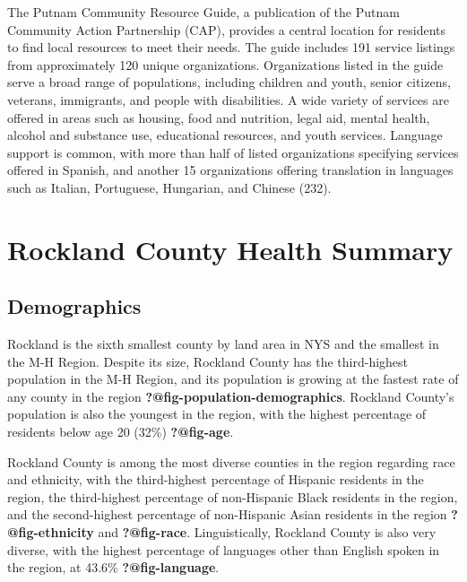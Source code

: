 \documentclass[
  english,
  letterpaper,
]{report}
\begin{document}
The Putnam Community Resource Guide, a publication of the Putnam
Community Action Partnership (CAP), provides a central location for
residents to find local resources to meet their needs. The guide
includes 191 service listings from approximately 120 unique
organizations. Organizations listed in the guide serve a broad range of
populations, including children and youth, senior citizens, veterans,
immigrants, and people with disabilities. A wide variety of services are
offered in areas such as housing, food and nutrition, legal aid, mental
health, alcohol and substance use, educational resources, and youth
services. Language support is common, with more than half of listed
organizations specifying services offered in Spanish, and another 15
organizations offering translation in languages such as Italian,
Portuguese, Hungarian, and Chinese (232).

\section{Rockland County Health
Summary}\label{rockland-county-health-summary}

\subsection{Demographics}\label{demographics-3}

Rockland is the sixth smallest county by land area in NYS and the
smallest in the M-H Region. Despite its size, Rockland County has the
third-highest population in the M-H Region, and its population is
growing at the fastest rate of any county in the region
\textbf{?@fig-population-demographics}. Rockland County's population is
also the youngest in the region, with the highest percentage of
residents below age 20 (32\%) \textbf{?@fig-age}.

Rockland County is among the most diverse counties in the region
regarding race and ethnicity, with the third-highest percentage of
Hispanic residents in the region, the third-highest percentage of
non-Hispanic Black residents in the region, and the second-highest
percentage of non-Hispanic Asian residents in the region
\textbf{?@fig-ethnicity} and \textbf{?@fig-race}. Linguistically,
Rockland County is also very diverse, with the highest percentage of
languages other than English spoken in the region, at 43.6\%
\textbf{?@fig-language}.
\end{document}
